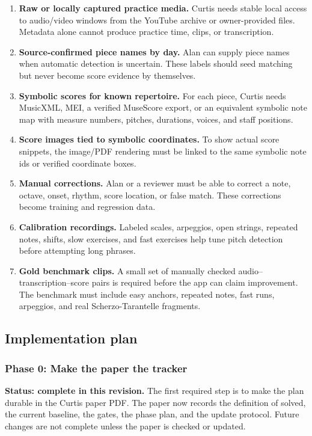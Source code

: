 \begin{enumerate}
    \item \textbf{Raw or locally captured practice media.} Curtis needs stable local access to audio/video windows from the YouTube archive or owner-provided files. Metadata alone cannot produce practice time, clips, or transcription.
    \item \textbf{Source-confirmed piece names by day.} Alan can supply piece names when automatic detection is uncertain. These labels should seed matching but never become score evidence by themselves.
    \item \textbf{Symbolic scores for known repertoire.} For each piece, Curtis needs MusicXML, MEI, a verified MuseScore export, or an equivalent symbolic note map with measure numbers, pitches, durations, voices, and staff positions.
    \item \textbf{Score images tied to symbolic coordinates.} To show actual score snippets, the image/PDF rendering must be linked to the same symbolic note ids or verified coordinate boxes.
    \item \textbf{Manual corrections.} Alan or a reviewer must be able to correct a note, octave, onset, rhythm, score location, or false match. These corrections become training and regression data.
    \item \textbf{Calibration recordings.} Labeled scales, arpeggios, open strings, repeated notes, shifts, slow exercises, and fast exercises help tune pitch detection before attempting long phrases.
    \item \textbf{Gold benchmark clips.} A small set of manually checked audio--transcription--score pairs is required before the app can claim improvement. The benchmark must include easy anchors, repeated notes, fast runs, arpeggios, and real Scherzo-Tarantelle fragments.
\end{enumerate}

\subsection{Implementation plan}

\subsubsection*{Phase 0: Make the paper the tracker}

\textbf{Status: complete in this revision.} The first required step is to make the plan durable in the Curtis paper PDF. The paper now records the definition of solved, the current baseline, the gates, the phase plan, and the update protocol. Future changes are not complete unless the paper is checked or updated.

